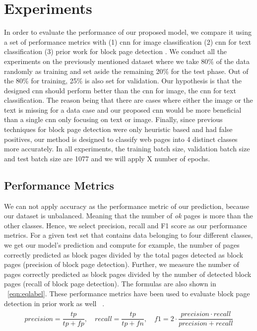 \documentclass{article} %
\begin{document}
\section{Experiments}
In order to evaluate the performance of our proposed model, we compare it using a set of performance metrics with (1) cnn for image classification (2) cnn for text classification (3) prior work for block page detection . We conduct all the experiments on the previously mentioned dataset where we take 80\% of the data randomly as training and set aside the remaining 20\% for the test phase. Out of the 80\% for training, 25\% is also set for validation. Our hypothesis is that the designed cnn should perform better than the cnn for image, the cnn for text classification. The reason being that there are cases where either the image or the text is missing for a data case and our proposed cnn would be more beneficial than a single cnn only focusing on text or image. Finally, since previous techniques for block page detection were only heuristic based and had false positives, our method is designed to classify web pages into 4 distinct classes more accurately. In all experiments, the training batch size, validation batch size and test batch size are 1077 and we will apply X number of epochs.


\subsection{Performance Metrics}
We can not apply accuracy as the performance metric of our prediction, because our dataset is unbalanced. Meaning that the number of \textit{ok} pages is more than the other classes. Hence, we select precision, recall and F1 score as our performance metrics. For a given test set that contains data belonging to four different classes, we get our model's prediction and compute for example, the number of pages correctly predicted as block pages divided by the total pages detected as block pages (precision of block page detection). Further, we measure the number of pages correctly predicted as block pages divided by the number of detected block pages (recall of block page detection). The formulas are also shown in ~\ref{eqn:eqlabel}. These performance metrics have been used to evaluate block page detection in prior work as well ~\cite{imc14_phillipa}.
\begin{align}
\label{eqn:eqlabel}
\begin{split}
 precision = \dfrac{tp}{tp+fp} , \quad 
recall = \dfrac{tp}{tp+fn}, \quad 
f1 = 2 \cdot \dfrac{precision \cdot recall}{precision + recall}
\end{split}
\end{align}
\end{document}
